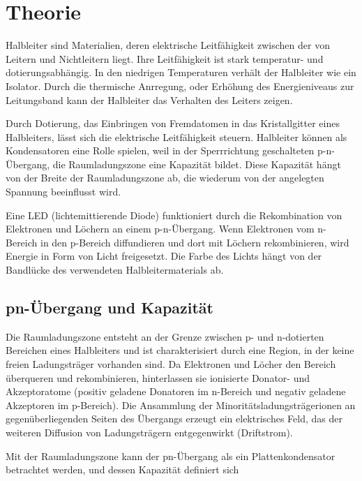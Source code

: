 \newpage

\section{Theorie}

Halbleiter sind Materialien, deren elektrische Leitfähigkeit zwischen der von Leitern und Nichtleitern liegt. Ihre Leitfähigkeit ist stark temperatur- und dotierungsabhängig. In den niedrigen Temperaturen verhält der Halbleiter wie ein Isolator. Durch die thermische Anrregung, oder Erhöhung des Energieniveaus zur Leitungsband kann der Halbleiter das Verhalten des Leiters zeigen.

Durch Dotierung, das Einbringen von Fremdatomen in das Kristallgitter eines Halbleiters, lässt sich die elektrische Leitfähigkeit steuern. Halbleiter können als Kondensatoren eine Rolle spielen, weil in der Sperrrichtung geschalteten p-n-Übergang, die Raumladungszone eine Kapazität bildet. Diese Kapazität hängt von der Breite der Raumladungszone ab, die wiederum von der angelegten Spannung beeinflusst wird.

Eine LED (lichtemittierende Diode) funktioniert durch die Rekombination von Elektronen und Löchern an einem p-n-Übergang. Wenn Elektronen vom n-Bereich in den p-Bereich diffundieren und dort mit Löchern rekombinieren, wird Energie in Form von Licht freigesetzt. Die Farbe des Lichts hängt von der Bandlücke des verwendeten Halbleitermaterials ab.

\subsection{pn-Übergang und Kapazität}
Die Raumladungszone entsteht an der Grenze zwischen p- und n-dotierten Bereichen eines Halbleiters und ist charakterisiert durch eine Region, in der keine freien Ladungsträger vorhanden sind. Da Elektronen und Löcher den Bereich überqueren und rekombinieren, hinterlassen sie ionisierte Donator- und Akzeptoratome (positiv geladene Donatoren im n-Bereich und negativ geladene Akzeptoren im p-Bereich). Die Ansammlung der Minoritätsladungsträgerionen an gegenüberliegenden Seiten des Übergangs erzeugt ein elektrisches Feld, das der weiteren Diffusion von Ladungsträgern entgegenwirkt (Driftstrom). 

Mit der Raumladungszone kann der pn-Übergang als ein Plattenkondensator betrachtet werden, und dessen Kapazität definiert sich 

